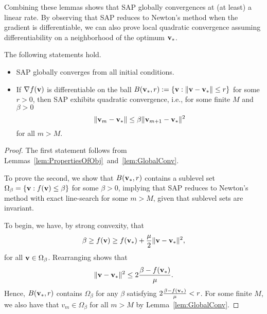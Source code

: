 Combining these lemmas shows that SAP globally convergences at (at least) a
linear rate.  By observing that SAP reduces to Newton's
method when the gradient is differentiable, we can also prove local quadratic
convergence assuming differentiability on a neighborhood of
the optimum ${\mathbf{v}}_*$. 
\begin{theorem}
  The following statements hold.
  \begin{itemize}
    \item SAP globally converges from all initial conditions.
    \item If $\nabla f({\mathbf{v}})$  is differentiable on the ball $B({\mathbf{v}}_*, r) := \{ {\mathbf{v}} :  \|{\mathbf{v}}-{\mathbf{v}}_*\| \le r\}$
  for some $r > 0$, then SAP exhibits quadratic convergence, i.e., for some finite
  $M$ and $\beta > 0$
  \[
    \|{\mathbf{v}}_m - {\mathbf{v}}_*\| \le \beta \|{\mathbf{v}}_{m+1} - {\mathbf{v}}_*\|^2
  \]
  for all $m > M$.
  \end{itemize}

  \begin{proof}

    The first statement follows from Lemmas~\ref{lem:PropertiesOfObj}~and~\ref{lem:GlobalConv}.

  To prove the second, we show that $B({\mathbf{v}}_*, r)$
    contains a sublevel set $\Omega_{\beta} = \{ {\mathbf{v}} : f({\mathbf{v}}) \le \beta\}$ for some
  $\beta > 0$,  implying that SAP 
  reduces to Newton's method with exact line-search for some $m > M$,
 given that sublevel sets are invariant. 

  To begin, we have, by strong convexity, that
  \begin{equation}
    \beta \ge f(\vx) \ge f(\vx_*)  + \frac{\mu}{2} \|\vx-\vx_*\|^2,
    \label{eq:strong_convexity_at_differentiable_optimal}
  \end{equation}
    for all ${\mathbf{v}} \in \Omega_{\beta}$.
    Rearranging shows that
    \[
      \|{\mathbf{v}}-{\mathbf{v}}_*\|^2 \le 2\frac{\beta- f({\mathbf{v}}_*)}{\mu}.
    \]
    Hence, $B({\mathbf{v}}_*, r)$ contains
    $\Omega_{\beta}$ for any $\beta$ satisfying $2\frac{\beta- f({\mathbf{v}}_*)}{\mu} < r$.
    For some finite $M$, we also have that $v_m \in \Omega_{\beta}$ for all $m > M$ 
    by Lemma~\ref{lem:GlobalConv}.


\end{proof}
\end{theorem}
